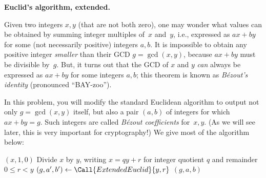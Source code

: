 \documentclass[11pt,addpoints,answers]{exam}
\begin{document}
\begin{questions}
\begin{parts}
    \begin{solution}
    \end{solution}
    
  \end{parts}

    
  \question \textbf{Euclid's algorithm, extended.}
  
  Given two integers $x,y$ (that are not both zero), one may wonder what values can be obtained by summing integer multiples of~$x$ and~$y$, i.e., expressed as $ax+by$ for some (not necessarily positive) integers $a,b$.
  It is impossible to obtain any positive integer \emph{smaller} than their GCD $g = \gcd(x,y)$, because $ax+by$ must be divisible by~$g$.
  But, it turns out that the GCD of $x$ and $y$ \emph{can} always be expressed as $ax+by$ for some integers $a,b$; this theorem is known as \emph{B\'{e}zout's identity} (pronounced ``BAY-zoo'').
    
  In this problem, you will modify the standard Euclidean algorithm to output not only $g=\gcd(x,y)$ itself, but also a pair $(a,b)$ of integers for which $ax+by = g$.
  Such integers are called \emph{B\'{e}zout coefficients} for~$x,y$.   (As we will see later, this is very important for cryptography!)
  We give most of the algorithm below:
    
    \begin{minipage}{\linewidth}
      \begin{algorithm}[H]
        \begin{algorithmic}[1]
            \Statex
             \State \Return $(x,1,0)$
            \Else \State Divide $x$ by $y$, writing $x = qy + r$ for integer quotient $q$ and remainder $0\leq r < y$
            \State $(g,a',b') \gets \Call{ExtendedEuclid}{y,r}$
            \State \Return $(g, a, b)$
            \EndIf
            \EndFunction
        \end{algorithmic}
      \end{algorithm}
    \end{minipage}

\end{questions}
\end{document}
